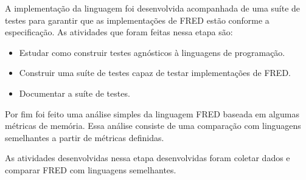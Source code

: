 A implementação da linguagem foi desenvolvida acompanhada de uma suíte de testes 
para garantir que as implementações de FRED estão conforme a especificação.
As atividades que foram feitas nessa etapa são:

\begin{itemize}
    \item Estudar como construir testes agnósticos à linguagens de programação.
    \item Construir uma suíte de testes capaz de testar implementações de FRED.
    \item Documentar a suíte de testes.
\end{itemize}

Por fim foi feito uma análise simples da linguagem FRED baseada em algumas métricas
de memória. Essa análise consiste de uma comparação com linguagens semelhantes a 
partir de métricas definidas.

As  atividades desenvolvidas nessa etapa desenvolvidas foram coletar dados e 
comparar FRED com linguagens semelhantes.